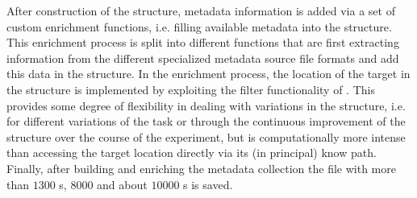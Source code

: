 After construction of the  structure, metadata information is added via a set of custom enrichment functions, i.e. filling available metadata into the structure. This enrichment process is split into different functions that are first extracting information from the different specialized metadata source file formats and add this data in the  structure. In the enrichment process, the location of the target  in the structure is implemented by exploiting the filter functionality of . This provides some degree of flexibility in dealing with variations in the  structure, i.e. for different variations of the task or through the continuous improvement of the structure over the course of the experiment, but is computationally more intense than accessing the target location directly via its (in principal) know path. Finally, after building and enriching the metadata collection the  file with more than $1300$ s, $8000$  and about $10000$ s is saved.

